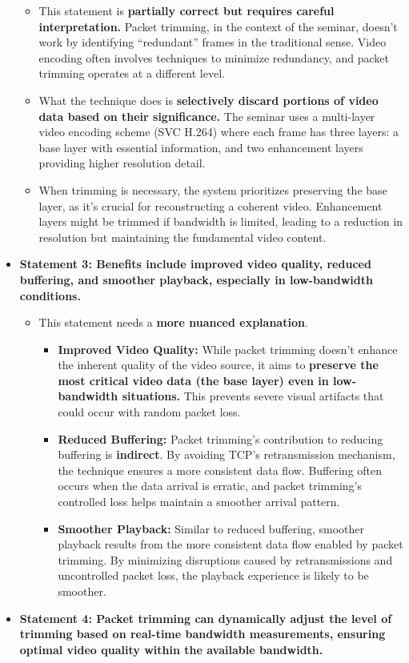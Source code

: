 \documentclass[
]{article}
\begin{document}
\begin{itemize}
\begin{itemize}
  \item
    This statement is \textbf{partially correct but requires careful
    interpretation.} Packet trimming, in the context of the seminar,
    doesn't work by identifying ``redundant'' frames in the traditional
    sense. Video encoding often involves techniques to minimize
    redundancy, and packet trimming operates at a different level.
  \item
    What the technique does is \textbf{selectively discard portions of
    video data based on their significance.} The seminar uses a
    multi-layer video encoding scheme (SVC H.264) where each frame has
    three layers: a base layer with essential information, and two
    enhancement layers providing higher resolution detail.
  \item
    When trimming is necessary, the system prioritizes preserving the
    base layer, as it's crucial for reconstructing a coherent video.
    Enhancement layers might be trimmed if bandwidth is limited, leading
    to a reduction in resolution but maintaining the fundamental video
    content.
  \end{itemize}
\item
  \textbf{Statement 3: Benefits include improved video quality, reduced
  buffering, and smoother playback, especially in low-bandwidth
  conditions.}

  \begin{itemize}
  
  \item
    This statement needs a \textbf{more nuanced explanation}.

    \begin{itemize}
    
    \item
      \textbf{Improved Video Quality:} While packet trimming doesn't
      enhance the inherent quality of the video source, it aims to
      \textbf{preserve the most critical video data (the base layer)
      even in low-bandwidth situations.} This prevents severe visual
      artifacts that could occur with random packet loss.
    \item
      \textbf{Reduced Buffering:} Packet trimming's contribution to
      reducing buffering is \textbf{indirect}. By avoiding TCP's
      retransmission mechanism, the technique ensures a more consistent
      data flow. Buffering often occurs when the data arrival is
      erratic, and packet trimming's controlled loss helps maintain a
      smoother arrival pattern.
    \item
      \textbf{Smoother Playback:} Similar to reduced buffering, smoother
      playback results from the more consistent data flow enabled by
      packet trimming. By minimizing disruptions caused by
      retransmissions and uncontrolled packet loss, the playback
      experience is likely to be smoother.
    \end{itemize}
  \end{itemize}
\item
  \textbf{Statement 4: Packet trimming can dynamically adjust the level
  of trimming based on real-time bandwidth measurements, ensuring
  optimal video quality within the available bandwidth.}


\end{itemize}
\end{document}
